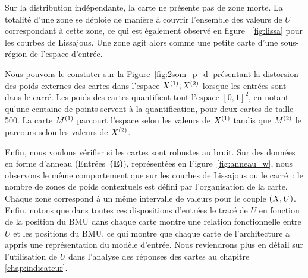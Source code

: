 \documentclass[../main]{subfiles}
\begin{document}
Sur la distribution indépendante, la carte ne présente pas de zone morte. La totalité d'une zone se déploie de manière à couvrir l'ensemble des valeurs de $U$ correspondant à cette zone, ce qui est également observé en figure ~\ref{fig:lissa} pour les courbes de Lissajous. Une zone agit alors comme une petite carte d'une sous-région de l'espace d'entrée. 

Nous pouvons le constater sur la Figure~\ref{fig:2som_p_d} présentant la distorsion des poids externes des cartes dans l'espace $X^{({1})}; X^{({2})}$ lorsque les entrées sont dans le carré. Les poids des cartes quantifient tout l'espace $[0,1]^2$, en notant qu'une centaine de points servent à la quantification, pour deux cartes de taille 500. La carte $M^{({1})}$ parcourt l'espace selon les valeurs de $X^{({1})}$ tandis que $M^{({2})}$ le parcours selon les valeurs de $X^{({2})}$.


Enfin, nous voulons vérifier si les cartes sont robustes au bruit. 
Sur des données en forme d'anneau (Entrées~\textbf{(E)}), représentées en Figure~\ref{fig:anneau_w}, nous observons le même comportement que sur les courbes de Lissajous ou le carré~: le nombre de zones de poids contextuels est défini par l'organisation de la carte. Chaque zone correspond à un même intervalle de valeurs pour le couple $(X, U)$.
Enfin, notons que dans toutes ces dispositions d'entrées le tracé de $U$ en fonction de la position du BMU dans chaque carte montre une relation fonctionnelle entre $U$ et les positions du BMU, ce qui montre que chaque carte de l'architecture a appris une représentation du modèle d'entrée. Nous reviendrons plus en détail sur l'utilisation de $U$ dans l'analyse des réponses des cartes au chapitre \ref{chap:indicateur}.
\end{document}
